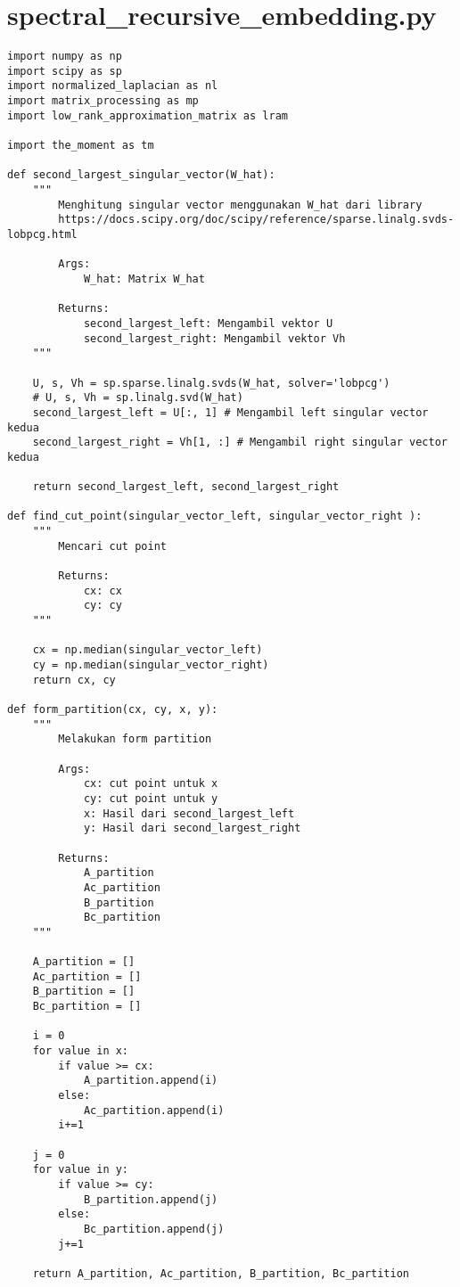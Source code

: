 \chapter{spectral\_recursive\_embedding.py}
\begin{lstlisting}[breaklines=true]
import numpy as np
import scipy as sp
import normalized_laplacian as nl
import matrix_processing as mp
import low_rank_approximation_matrix as lram

import the_moment as tm

def second_largest_singular_vector(W_hat):
	"""
		Menghitung singular vector menggunakan W_hat dari library
		https://docs.scipy.org/doc/scipy/reference/sparse.linalg.svds-lobpcg.html    
		
		Args:
			W_hat: Matrix W_hat

		Returns:
			second_largest_left: Mengambil vektor U
			second_largest_right: Mengambil vektor Vh
	"""
	
	U, s, Vh = sp.sparse.linalg.svds(W_hat, solver='lobpcg')
	# U, s, Vh = sp.linalg.svd(W_hat)
	second_largest_left = U[:, 1] # Mengambil left singular vector kedua
	second_largest_right = Vh[1, :] # Mengambil right singular vector kedua
	
	return second_largest_left, second_largest_right

def find_cut_point(singular_vector_left, singular_vector_right ):
	"""
		Mencari cut point

		Returns:
			cx: cx
			cy: cy
	"""
	
	cx = np.median(singular_vector_left)  
	cy = np.median(singular_vector_right) 
	return cx, cy

def form_partition(cx, cy, x, y):
	"""
		Melakukan form partition
		
		Args:
			cx: cut point untuk x
			cy: cut point untuk y
			x: Hasil dari second_largest_left
			y: Hasil dari second_largest_right
			
		Returns:
			A_partition
			Ac_partition
			B_partition
			Bc_partition
	"""
	
	A_partition = []
	Ac_partition = []
	B_partition = []
	Bc_partition = []

	i = 0
	for value in x:
		if value >= cx:
			A_partition.append(i)
		else:
			Ac_partition.append(i)
		i+=1

	j = 0
	for value in y:
		if value >= cy:
			B_partition.append(j)
		else:
			Bc_partition.append(j)
		j+=1
	
	return A_partition, Ac_partition, B_partition, Bc_partition



\end{lstlisting}
